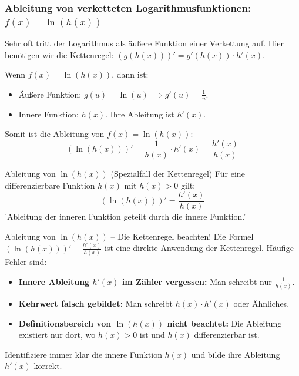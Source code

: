 \subsubsection{Ableitung von verketteten Logarithmusfunktionen: \texorpdfstring{$f(x) = \ln(h(x))$}{f(x) = ln(h(x))}}
Sehr oft tritt der Logarithmus als äußere Funktion einer Verkettung auf. Hier benötigen wir die Kettenregel: $(g(h(x)))' = g'(h(x)) \cdot h'(x)$.

Wenn $f(x) = \ln(h(x))$, dann ist:
\begin{itemize}
    \item Äußere Funktion: $g(u) = \ln(u) \implies g'(u) = \frac{1}{u}$.
    \item Innere Funktion: $h(x)$. Ihre Ableitung ist $h'(x)$.
\end{itemize}
Somit ist die Ableitung von $f(x) = \ln(h(x))$:
\[ (\ln(h(x)))' = \frac{1}{h(x)} \cdot h'(x) = \frac{h'(x)}{h(x)} \]

\begin{merksatzumgebung}{Ableitung von \texorpdfstring{$\ln(h(x))$}{ln(h(x))} (Spezialfall der Kettenregel)}
Für eine differenzierbare Funktion $h(x)$ mit $h(x)>0$ gilt:
\[ (\ln(h(x)))' = \frac{h'(x)}{h(x)} \]
'Ableitung der inneren Funktion geteilt durch die innere Funktion.'
\end{merksatzumgebung}

\begin{fehlerboxumgebung}{Ableitung von $\ln(h(x))$ – Die Kettenregel beachten!}
Die Formel $(\ln(h(x)))' = \frac{h'(x)}{h(x)}$ ist eine direkte Anwendung der Kettenregel. Häufige Fehler sind:
\begin{itemize}
    \item \textbf{Innere Ableitung $h'(x)$ im Zähler vergessen:} Man schreibt nur $\frac{1}{h(x)}$.
    \item \textbf{Kehrwert falsch gebildet:} Man schreibt $h(x) \cdot h'(x)$ oder Ähnliches.
    \item \textbf{Definitionsbereich von $\ln(h(x))$ nicht beachtet:} Die Ableitung existiert nur dort, wo $h(x)>0$ ist und $h(x)$ differenzierbar ist.
\end{itemize}
Identifiziere immer klar die innere Funktion $h(x)$ und bilde ihre Ableitung $h'(x)$ korrekt.
\end{fehlerboxumgebung}

